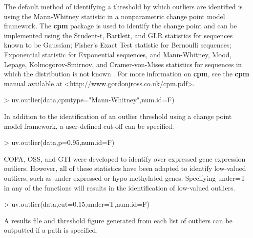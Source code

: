 \documentclass[11pt, a4paper]{article}
\begin{document}
\begin{Schunk}
\end{Schunk}
The default method of identifying a threshold by which outliers are identified is using the Mann-Whitney statistic in a nonparametric change point model framework. The \textbf{cpm} package is used to identify the change point and can be implemented using the Student-t, Bartlett, and GLR statistics for sequences known to be Gaussian; Fisher's Exact Test statistic for Bernoulli sequences; Exponential statistic for Exponential sequences, and Mann-Whitney, Mood, Lepage, Kolmogorov-Smirnov, and Cramer-von-Mises statistics for sequences in which the distribution is not known \cite{cpm}. For more information on \textbf{cpm}, see the \textbf{cpm} manual available at <http://www.gordonjross.co.uk/cpm.pdf>.
\begin{Schunk}
\begin{Sinput}
> uv.outlier(data,cpmtype="Mann-Whitney",num.id=F)
\end{Sinput}
\end{Schunk}
In addition to the identification of an outlier threshold using a change point model framework, a user-defined cut-off can be specified.
\begin{Schunk}
\begin{Sinput}
> uv.outlier(data,p=0.95,num.id=F)
\end{Sinput}
\end{Schunk}
COPA, OSS, and GTI were developed to identify over expressed gene expression outliers. However, all of these statistics have been adapted to identify low-valued outliers, such as under expressed or hypo methylated genes. Specifying under=T in any of the functions will results in the identification of low-valued outliers.   
\begin{Schunk}
\begin{Sinput}
> uv.outlier(data,cut=0.15,under=T,num.id=F)
\end{Sinput}
\end{Schunk}
A results file and threshold figure generated from each list of outliers can be outputted if a path is specified.
\end{document}
